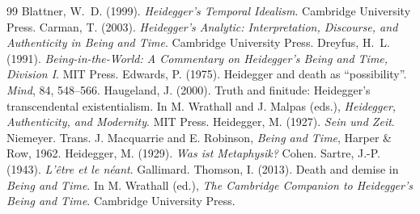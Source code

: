 \documentclass{situationist-preprint}
\begin{document}
\begin{thebibliography}{99}\small
{} Blattner, W.~D. (1999). \emph{Heidegger's Temporal Idealism}. Cambridge University Press.
 Carman, T. (2003). \emph{Heidegger's Analytic: Interpretation, Discourse, and Authenticity in Being and Time}. Cambridge University Press.
 Dreyfus, H.~L. (1991). \emph{Being-in-the-World: A Commentary on Heidegger's Being and Time, Division I}. MIT Press.
 Edwards, P. (1975). Heidegger and death as \enquote{possibility}. \emph{Mind}, 84, 548--566.
 Haugeland, J. (2000). Truth and finitude: Heidegger's transcendental existentialism. In M. Wrathall and J. Malpas (eds.), \emph{Heidegger, Authenticity, and Modernity}. MIT Press.
 Heidegger, M. (1927). \emph{Sein und Zeit}. Niemeyer. Trans. J. Macquarrie and E. Robinson, \emph{Being and Time}, Harper \& Row, 1962.
 Heidegger, M. (1929). \emph{Was ist Metaphysik?} Cohen.
 Sartre, J.-P. (1943). \emph{L'\^etre et le n\'eant}. Gallimard.
 Thomson, I. (2013). Death and demise in \emph{Being and Time}. In M. Wrathall (ed.), \emph{The Cambridge Companion to Heidegger's Being and Time}. Cambridge University Press.
\end{thebibliography}
\end{document}
